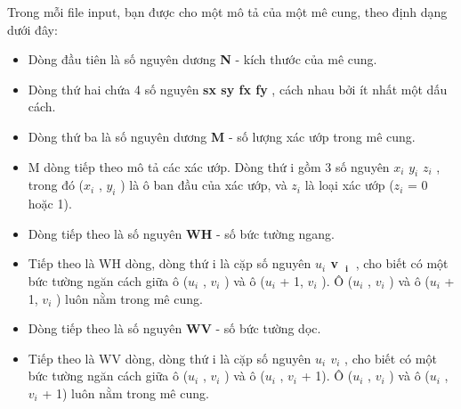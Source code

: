 Trong mỗi file input, bạn được cho một mô tả của một mê cung, theo định dạng dưới đây:
\begin{itemize}
	\item Dòng đầu tiên là số nguyên dương \textbf{ N } - kích thước của mê cung.
	\item Dòng thứ hai chứa 4 số nguyên \textbf{ sx sy fx fy } , cách nhau bởi ít nhất một dấu cách.
	\item Dòng thứ ba là số nguyên dương \textbf{ M } - số lượng xác ướp trong mê cung.
	\item M dòng tiếp theo mô tả các xác ướp. Dòng thứ i gồm 3 số nguyên \textbf{ $x_{i}$}\textbf{ $y_{i}$}\textbf{ $z_{i}$} , trong đó ($x_{i}$ , $y_{i}$ ) là ô ban đầu của xác ướp, và $z_{i}$ là loại xác ướp ($z_{i}$ = 0 hoặc 1).
	\item Dòng tiếp theo là số nguyên \textbf{ WH } - số bức tường ngang.
	\item Tiếp theo là WH dòng, dòng thứ i là cặp số nguyên \textbf{ $u_{i}$ v }$_\textbf{ i }$ , cho biết có một bức tường ngăn cách giữa ô ($u_{i}$ , $v_{i}$ ) và ô ($u_{i}$ + 1, $v_{i}$ ). Ô ($u_{i}$ , $v_{i}$ ) và ô ($u_{i}$ + 1, $v_{i}$ ) luôn nằm trong mê cung.
	\item Dòng tiếp theo là số nguyên \textbf{ WV } - số bức tường dọc.
	\item Tiếp theo là WV dòng, dòng thứ i là cặp số nguyên \textbf{ $u_{i}$ $v_{i}$} , cho biết có một bức tường ngăn cách giữa ô ($u_{i}$ , $v_{i}$ ) và ô ($u_{i}$ , $v_{i}$ + 1). Ô ($u_{i}$ , $v_{i}$ ) và ô ($u_{i}$ , $v_{i}$ + 1) luôn nằm trong mê cung.
\end{itemize}